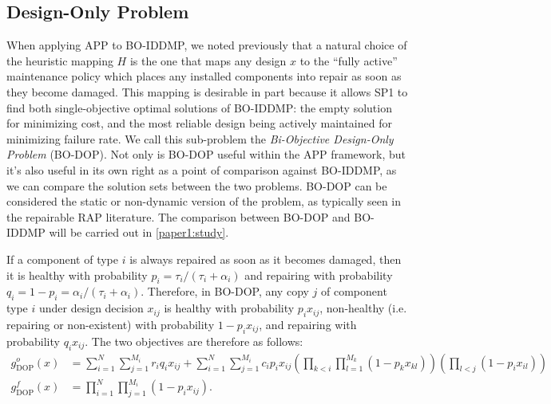 \documentclass[11pt,authoryear,a4paper]{article}
\theoremstyle{definition}
\begin{document}
\subsection{Design-Only Problem}
\label{paper1:methodology:dop}
When applying APP to BO-IDDMP, we noted previously that a natural choice of the heuristic mapping $H$ is the one that maps any design $x$ to the ``fully active'' maintenance policy which places any installed components into repair as soon as they become damaged. This mapping is desirable in part because it allows SP1 to find both single-objective optimal solutions of BO-IDDMP: the empty solution for minimizing cost, and the most reliable design being actively maintained for minimizing failure rate. We call this sub-problem the \emph{Bi-Objective Design-Only Problem} (BO-DOP). Not only is BO-DOP useful within the APP framework, but it's also useful in its own right as a point of comparison against BO-IDDMP, as we can compare the solution sets between the two problems. BO-DOP can be considered the static or non-dynamic version of the problem, as typically seen in the repairable RAP literature. The comparison between BO-DOP and BO-IDDMP will be carried out in \autoref{paper1:study}.

If a component of type $i$ is always repaired as soon as it becomes damaged, then it is healthy with probability $p_i = \tau_i/(\tau_i + \alpha_i)$ and repairing with probability $q_i = 1-p_i = \alpha_i/(\tau_i + \alpha_i)$.
Therefore, in BO-DOP, any copy $j$ of component type $i$ under design decision $x_{ij}$ is healthy with probability $p_ix_{ij}$, non-healthy (i.e. repairing or non-existent) with probability $1-p_ix_{ij}$, and repairing with probability $q_ix_{ij}$. The two objectives are therefore as follows:
\begin{align}
    g^o_{\text{DOP}}(x) &=\sum_{i=1}^N\sum_{j=1}^{M_i}  r_iq_ix_{ij} +\sum_{i=1}^N\sum_{j=1}^{M_i}c_ip_ix_{ij}\left(\prod_{k<i}\prod_{l=1}^{M_k}(1 - p_kx_{kl})\right)\left(\prod_{l<j}(1 - p_ix_{il})\right) \label{BO-DOP-obj1}\\
    g^f_{\text{DOP}}(x) & = \prod_{i=1}^N\prod_{j=1}^{M_i}(1-p_ix_{ij}). \label{BO-DOP-obj2}
\end{align}
\end{document}
